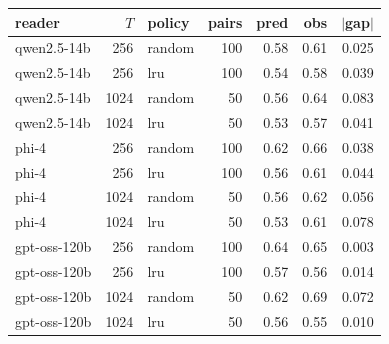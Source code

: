 \begin{tabular}{@{}lrlrrrr@{}}
\toprule
reader & $T$ & policy & pairs & pred & obs & $|$gap$|$ \\
\midrule
qwen2.5-14b & 256 & random & 100 & 0.58 & 0.61 & 0.025 \\
qwen2.5-14b & 256 & lru & 100 & 0.54 & 0.58 & 0.039 \\
qwen2.5-14b & 1024 & random & 50 & 0.56 & 0.64 & 0.083 \\
qwen2.5-14b & 1024 & lru & 50 & 0.53 & 0.57 & 0.041 \\
phi-4 & 256 & random & 100 & 0.62 & 0.66 & 0.038 \\
phi-4 & 256 & lru & 100 & 0.56 & 0.61 & 0.044 \\
phi-4 & 1024 & random & 50 & 0.56 & 0.62 & 0.056 \\
phi-4 & 1024 & lru & 50 & 0.53 & 0.61 & 0.078 \\
gpt-oss-120b & 256 & random & 100 & 0.64 & 0.65 & 0.003 \\
gpt-oss-120b & 256 & lru & 100 & 0.57 & 0.56 & 0.014 \\
gpt-oss-120b & 1024 & random & 50 & 0.62 & 0.69 & 0.072 \\
gpt-oss-120b & 1024 & lru & 50 & 0.56 & 0.55 & 0.010 \\
\bottomrule
\end{tabular}
